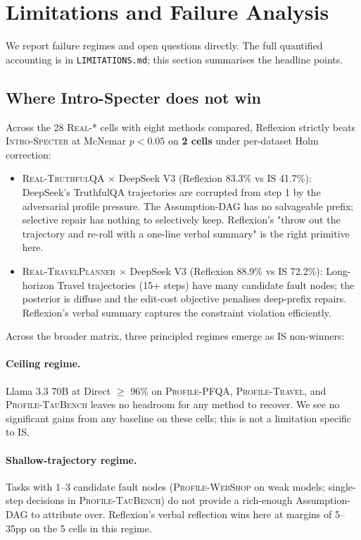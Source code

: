 \section{Limitations and Failure Analysis}
\label{sec:limitations}

We report failure regimes and open questions directly. The full
quantified accounting is in \texttt{LIMITATIONS.md}; this section
summarises the headline points.

\subsection{Where Intro-Specter does not win}

Across the 28 \textsc{Real-*} cells with eight methods compared,
Reflexion strictly beats \textsc{Intro-Specter} at McNemar
$p < 0.05$ on \textbf{2 cells} under per-dataset Holm correction:

\begin{itemize}[leftmargin=*,itemsep=2pt,topsep=2pt]
\item \textsc{Real-TruthfulQA} $\times$ DeepSeek V3 (Reflexion 83.3\%
vs IS 41.7\%): DeepSeek's TruthfulQA trajectories are corrupted
from step 1 by the adversarial profile pressure. The
Assumption-DAG has no salvageable prefix; selective repair has
nothing to selectively keep. Reflexion's "throw out the
trajectory and re-roll with a one-line verbal summary" is the
right primitive here.
\item \textsc{Real-TravelPlanner} $\times$ DeepSeek V3 (Reflexion
88.9\% vs IS 72.2\%): Long-horizon Travel trajectories (15+ steps)
have many candidate fault nodes; the posterior is diffuse and the
edit-cost objective penalises deep-prefix repairs. Reflexion's
verbal summary captures the constraint violation efficiently.
\end{itemize}

Across the broader matrix, three principled regimes emerge as IS
non-winners:

\paragraph{Ceiling regime.}
Llama 3.3 70B at Direct $\geq$ 96\% on \textsc{Profile-PFQA},
\textsc{Profile-Travel}, and \textsc{Profile-TauBench} leaves no
headroom for any method to recover. We see no significant
gains from any baseline on these cells; this is not a
limitation specific to IS.

\paragraph{Shallow-trajectory regime.}
Tasks with 1--3 candidate fault nodes (\textsc{Profile-WebShop} on
weak models; single-step decisions in \textsc{Profile-TauBench})
do not provide a rich-enough Assumption-DAG to attribute over.
Reflexion's verbal reflection wins here at margins of 5--35pp on
the 5 cells in this regime.

